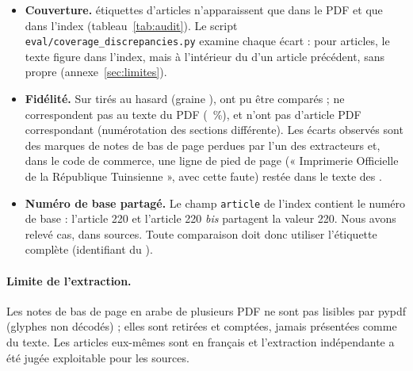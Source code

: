 \begin{itemize}
  \item \textbf{Couverture.} \NAuditOnlypdf{} étiquettes d'articles n'apparaissent que dans le PDF et \NAuditOnlyindex{}
        que dans l'index (tableau~\ref{tab:audit}). Le script \texttt{eval/coverage\_discrepancies.py} examine chaque
        écart : pour \NCoverageMerged{} articles, le texte figure dans l'index, mais à l'intérieur du  d'un
        article précédent, sans  propre (annexe~\ref{sec:limites}).
  \item \textbf{Fidélité.} Sur \NAuditN{}  tirés au hasard (graine \NSeed), \NAuditChecked{} ont pu être
        comparés ; \NAuditMismatch{} ne correspondent pas au texte du PDF (\NAuditRate~\%), et \NAuditNopdf{} n'ont pas
        d'article PDF correspondant (numérotation des sections différente). Les écarts observés sont des marques de notes
        de bas de page perdues par l'un des extracteurs et, dans le code de commerce, une ligne de pied de page
        (« Imprimerie Officielle de la République Tuinsienne », avec cette faute) restée dans le texte des .
  \item \textbf{Numéro de base partagé.} Le champ \texttt{article} de l'index contient le numéro de base : l'article
        220 et l'article 220 \emph{bis} partagent la valeur 220. Nous avons relevé \NAuditCollisions{} cas, dans
        \NAuditCollsources{} sources. Toute comparaison doit donc utiliser l'étiquette complète (identifiant du ).
\end{itemize}



\paragraph{Limite de l'extraction.} Les notes de bas de page en arabe de plusieurs PDF ne sont pas lisibles par pypdf
(glyphes non décodés) ; elles sont retirées et comptées, jamais présentées comme du texte. Les articles eux-mêmes sont en
français et l'extraction indépendante a été jugée exploitable pour les \NCorpusVerified{} sources.
